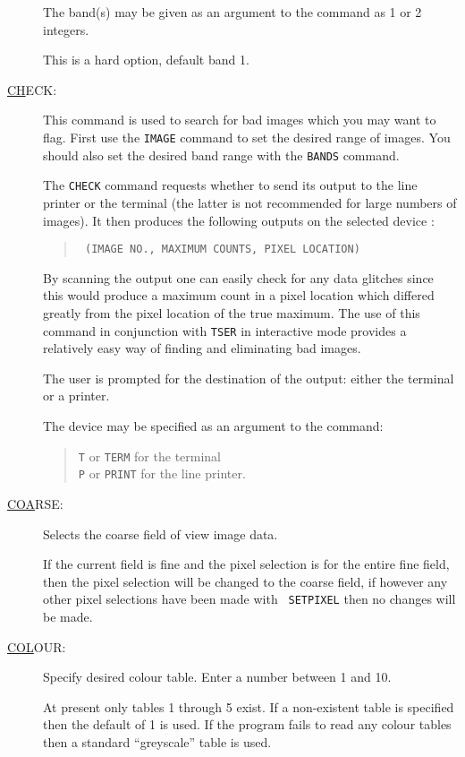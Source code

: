 \begin{description}
The band(s) may be given as an argument to the command as 1 or 2
integers.

This is a hard option, default band 1.

\item[\underline{CH}ECK: ] \label{ch}
This command is used to search for bad images which you may want to
flag. First use the {\tt IMAGE} command to set the desired range of
images. You should also set the desired band range with the {\tt BANDS}
command.

The {\tt CHECK} command requests whether to send its output to the line
printer or the terminal (the latter is not recommended for large
numbers of images). It then produces the following outputs on the
selected device :
\begin{quote}\tt
(IMAGE NO., MAXIMUM COUNTS, PIXEL LOCATION)
\end{quote}
By scanning the output one can easily check for any data glitches since
this would produce a maximum count in a pixel location which differed
greatly from the pixel location of the true maximum. The use of this
command in conjunction with {\tt TSER} in interactive mode provides a
relatively easy way of finding and eliminating bad images.

The user is prompted for the destination of the output: either the
terminal or a printer.

The device may be specified as an argument to the command:
\begin{quote}
{\tt T} or {\tt TERM} for the terminal\\ {\tt P} or {\tt PRINT} for the
line printer.
\end{quote}

\item[\underline{COA}RSE: ] \label{coa}
Selects the coarse field of view image data.

If the current field is fine and the pixel selection is for the entire
fine field, then the pixel selection will be changed to the coarse
field, if however any other pixel selections have been made with {\tt
SETPIXEL} then no changes will be made.

\item[\underline{COL}OUR: ] \label{col}
Specify desired colour table. Enter a number between 1 and 10.

At present only tables 1 through 5 exist. If a non-existent table is
specified then the default of 1 is used. If the program fails to read
any colour tables then a standard ``greyscale'' table is used.


\end{description}
